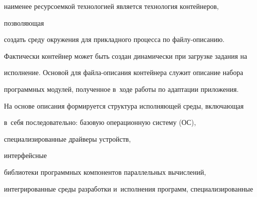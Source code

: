 наименее ресурсоемкой технологией является технология контейнеров,\linebreak\vspace*{-12pt}






\noindent

 позволяющая 

создать среду окружения для прикладного процесса по фай\-лу-опи\-са\-нию. 

      

      Фактически контейнер может быть создан динамически при загрузке задания на 

исполнение. Основой для фай\-ла-опи\-са\-ния контейнера служит описание набора 

программных модулей, полученное в~ходе работы по адаптации приложения.

      

      На основе описания формируется структура исполняющей среды, включающая 

в~себя последовательно: базовую операционную систему (ОС), 

специализированные драйверы устройств, 

интерфейсные\linebreak

 библиотеки программных компонентов параллельных вычислений, 

интегрированные среды разработки и~исполнения программ, специализированные 

